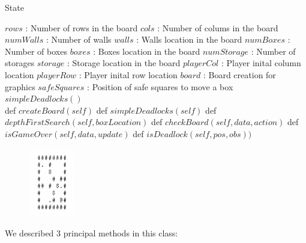 \documentclass{article}
\begin{document}
\begin{algorithm}
\caption{State}
\begin{algorithmic}
  \State $rows$ : Number of rows in the board
  \State $cols$ : Number of colums in the board
  \State $numWalls$ : Number of walls
  \State $walls$ : Walls location in the board
  \State $numBoxes$ : Number of boxes
  \State $boxes$ : Boxes location in the board
  \State $numStorage$ : Number of storages
  \State $storage$ : Storage location in the board
  \State $playerCol$ : Player inital column location 
  \State $playerRow$ : Player inital row location
  \State $board$ : Board creation for graphics
  \State $safeSquares$ : Position of safe squares to move a box
  \State $simpleDeadlocks()$ \\
  
  \State def $createBoard(self)$
  \State def $simpleDeadlocks(self)$
  \State def $depthFirstSearch(self, boxLocation)$
  \State def $checkBoard(self, data, action)$
  \State def $isGameOver(self, data, update)$
  \State def $isDeadlock(self, pos, obs))$
\EndStruct
\end{algorithmic}
\label{Class}
\end{algorithm}

\begin{figure} %
    \centering
    \includegraphics[width=0.18\textwidth]{board}
\end{figure}

We described 3 principal methods in this class:
    
\end{document}
